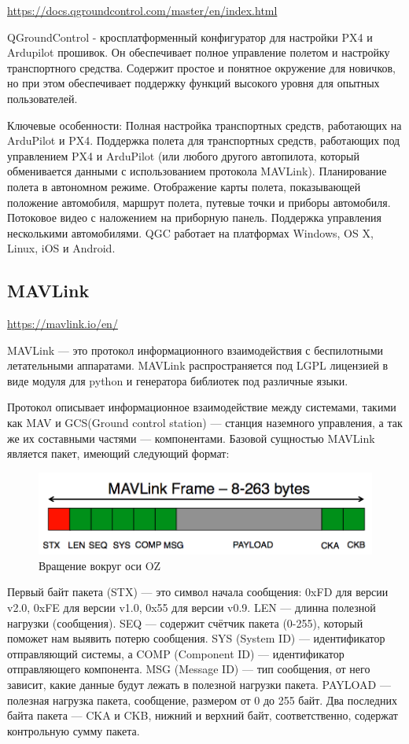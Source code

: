 \url{https://docs.qgroundcontrol.com/master/en/index.html}

QGroundControl - кросплатформенный конфигуратор для настройки PX4 и Ardupilot прошивок. Он обеспечивает полное управление полетом и настройку транспортного средства. Содержит простое и понятное окружение для новичков, но при этом обеспечивает поддержку функций высокого уровня для опытных пользователей.

Ключевые особенности:
Полная настройка транспортных средств, работающих на ArduPilot и PX4.
Поддержка полета для транспортных средств, работающих под управлением PX4 и ArduPilot (или любого другого автопилота, который обменивается данными с использованием протокола MAVLink).
Планирование полета в автономном режиме.
Отображение карты полета, показывающей положение автомобиля, маршрут полета, путевые точки и приборы автомобиля.
Потоковое видео с наложением на приборную панель.
Поддержка управления несколькими автомобилями.
QGC работает на платформах Windows, OS X, Linux, iOS и Android.

\subsection{MAVLink}
\url{https://mavlink.io/en/}

MAVLink — это протокол информационного взаимодействия с беспилотными летательными аппаратами. MAVLink распространяется под LGPL лицензией в виде модуля для python и генератора библиотек под различные языки. 

Протокол описывает информационное взаимодействие между системами, такими как MAV и GCS(Ground control station) — станция наземного управления, а так же их составными частями — компонентами. Базовой сущностью MAVLink является пакет, имеющий следующий формат:

\begin{figure}[H]
	\centering
	\includegraphics[width=0.5\linewidth]{pics/mavlink}
	\caption{Вращение вокруг оси OZ
	}
	\label{fig:mavlink}
\end{figure}

Первый байт пакета (STX) — это символ начала сообщения: 0xFD для версии v2.0, 0xFE для версии v1.0, 0x55 для версии v0.9. LEN — длинна полезной нагрузки (сообщения). SEQ — содержит счётчик пакета (0-255), который поможет нам выявить потерю сообщения. SYS (System ID) — идентификатор отправляющий системы, а COMP (Component ID) — идентификатор отправляющего компонента. MSG (Message ID) — тип сообщения, от него зависит, какие данные будут лежать в полезной нагрузки пакета. PAYLOAD — полезная нагрузка пакета, сообщение, размером от 0 до 255 байт. Два последних байта пакета — CKA и CKB, нижний и верхний байт, соответственно, содержат контрольную сумму пакета.

